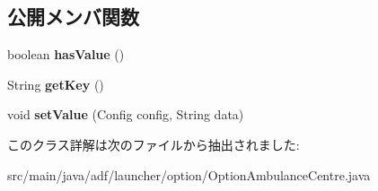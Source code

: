 \subsection*{公開メンバ関数}
\begin{DoxyCompactItemize}
\item 
\hypertarget{classadf_1_1launcher_1_1option_1_1OptionAmbulanceCentre_abdb5497c0cfa21a659e330a98a6124c0}{}\label{classadf_1_1launcher_1_1option_1_1OptionAmbulanceCentre_abdb5497c0cfa21a659e330a98a6124c0} 
boolean {\bfseries has\+Value} ()
\item 
\hypertarget{classadf_1_1launcher_1_1option_1_1OptionAmbulanceCentre_a5cc9104fd5f4f6f1a015fa7fd4f70774}{}\label{classadf_1_1launcher_1_1option_1_1OptionAmbulanceCentre_a5cc9104fd5f4f6f1a015fa7fd4f70774} 
String {\bfseries get\+Key} ()
\item 
\hypertarget{classadf_1_1launcher_1_1option_1_1OptionAmbulanceCentre_ab9d2a7e48b93c90426b20ef29d464b78}{}\label{classadf_1_1launcher_1_1option_1_1OptionAmbulanceCentre_ab9d2a7e48b93c90426b20ef29d464b78} 
void {\bfseries set\+Value} (Config config, String data)
\end{DoxyCompactItemize}


このクラス詳解は次のファイルから抽出されました\+:\begin{DoxyCompactItemize}
\item 
src/main/java/adf/launcher/option/Option\+Ambulance\+Centre.\+java\end{DoxyCompactItemize}

